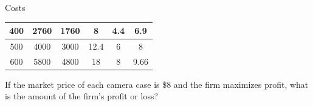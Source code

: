 \documentclass{beamer}
\begin{document}
\begin{frame}[t]{Costs}
\begin{table}[H]
\begin{tabular}{cccccc}
    400      & 2760                                                  & 1760                                                    & 8                                                        & 4.4                                                              & 6.9                                                           \\ \hline
    500      & 4000                                                  & 3000                                                    & 12.4                                                     & 6                                                                & 8                                                             \\ \hline
    600      & 5800                                                  & 4800                                                    & 18                                                       & 8                                                                & 9.66                                                         
    \end{tabular}
    \end{table}
    If the market price of each camera case is \$8 and the firm maximizes profit, what is the amount of the firm's profit or loss?
\end{frame}
\end{document}
